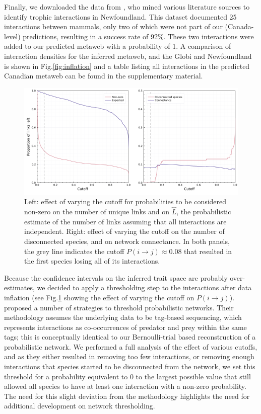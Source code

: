Finally, we downloaded the data from \cite{Strong2014ImpNon}, who mined
various literature sources to identify trophic interactions in
Newfoundland. This dataset documented 25 interactions between mammals,
only two of which were not part of our (Canada-level) predictions,
resulting in a success rate of 92\%. These two interactions were added
to our predicted metaweb with a probability of 1. A comparison of
interaction densities for the inferred metaweb, and the Globi and
Newfoundland is shown in Fig.\ref{fig:inflation} and a table listing all
interactions in the predicted Canadian metaweb can be found in the
supplementary material.

\begin{figure}[h]
    \centering
    \includegraphics[width=\textwidth]{figures/figure-cutoffs.png}
    \caption{Left: effect of varying the cutoff for probabilities to be
considered non-zero on the number of unique links and on \(\hat{L}\),
the probabilistic estimate of the number of links assuming that all
interactions are independent. Right: effect of varying the cutoff on the
number of disconnected species, and on network connectance. In both
panels, the grey line indicates the cutoff
\(P(i\rightarrow j) \approx 0.08\) that resulted in the first species
losing all of its interactions.}
    \label{fig:thresholds}
\end{figure}

Because the confidence intervals on the inferred trait space are
probably over-estimates, we decided to apply a thresholding step to the
interactions after data inflation (see Fig.\ref{fig:thresholds} showing the
effect of varying the cutoff on \(P(i \rightarrow j)\)).
\cite{Cirtwill2021BuiFoo} proposed a number of strategies to threshold
probabilistic networks. Their methodology assumes the underlying data to
be tag-based sequencing, which represents interactions as co-occurrences
of predator and prey within the same tags; this is conceptually
identical to our Bernoulli-trial based reconstruction of a probabilistic
network. We performed a full analysis of the effect of various cutoffs,
and as they either resulted in removing too few interactions, or
removing enough interactions that species started to be disconnected
from the network, we set this threshold for a probability equivalent to
0 to the largest possible value that still allowed all species to have
at least one interaction with a non-zero probability. The need for this
slight deviation from the \cite{Cirtwill2021BuiFoo} methodology highlights the
need for additional development on network thresholding.

